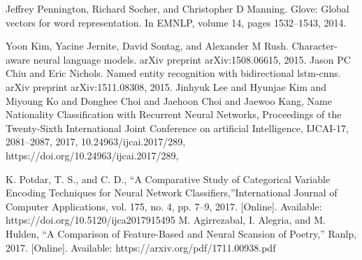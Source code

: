 \begin{thebibliography}{999}
 Jeffrey Pennington, Richard Socher, and Christopher D Manning. Glove: Global vectors for word representation. In EMNLP, volume 14, pages 1532–1543, 2014.

 Yoon Kim, Yacine Jernite, David Sontag, and Alexander M Rush. Character-aware neural language models. arXiv preprint arXiv:1508.06615, 2015.
 Jason PC Chiu and Eric Nichols. Named entity recognition with bidirectional lstm-cnns. arXiv preprint arXiv:1511.08308, 2015.
 Jinhyuk Lee and Hyunjae Kim and Miyoung Ko and Donghee Choi and Jaehoon Choi and Jaewoo Kang, Name Nationality Classification with Recurrent Neural Networks, Proceedings of the Twenty-Sixth International Joint Conference on artificial Intelligence, {IJCAI-17}, 2081--2087, 2017, 10.24963/ijcai.2017/289, https://doi.org/10.24963/ijcai.2017/289,

K. Potdar, T. S., and C. D., “A Comparative Study of Categorical Variable Encoding Techniques for Neural Network Classifiers,”International Journal of Computer Applications, vol. 175, no. 4, pp. 7–9, 2017. [Online]. Available: https://doi.org/10.5120/ijca2017915495
 M. Agirrezabal, I. Alegria, and M. Hulden, “A Comparison of Feature-Based and Neural Scansion of Poetry,” Ranlp, 2017. [Online]. Available: https://arxiv.org/pdf/1711.00938.pdf
  
\end{thebibliography}


%
%
%
%
\newpage
